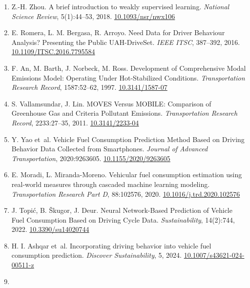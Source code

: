 \begin{enumerate}
{  \href{https://doi.org/10.1109/ACCESS.2026.3664118}{10.1109/ACCESS.2026.3664118}}
\item
  \label{r25}{Z.-H. Zhou. A brief introduction to weakly
  supervised learning. \emph{National Science Review}, 5(1):44--53,
  2018. \href{https://doi.org/10.1093/nsr/nwx106}{10.1093/nsr/nwx106}}
\item
  \label{r26}{E. Romera, L. M. Bergasa, R. Arroyo. Need
  Data for Driver Behaviour Analysis? Presenting the Public
  UAH-DriveSet. \emph{IEEE ITSC}, 387--392, 2016.
  \href{https://doi.org/10.1109/ITSC.2016.7795584}{10.1109/ITSC.2016.7795584}}
\item
  \label{r27}{F. An, M. Barth, J. Norbeck, M. Ross.
  Development of Comprehensive Modal Emissions Model: Operating Under
  Hot-Stabilized Conditions. \emph{Transportation Research Record},
  1587:52--62, 1997.
  \href{https://doi.org/10.3141/1587-07}{10.3141/1587-07}}
\item
  \label{r28}{S. Vallamsundar, J. Lin. MOVES Versus
  MOBILE: Comparison of Greenhouse Gas and Criteria Pollutant Emissions.
  \emph{Transportation Research Record}, 2233:27--35, 2011.
  \href{https://doi.org/10.3141/2233-04}{10.3141/2233-04}}
\item
  \label{r29}{Y. Yao et~al. Vehicle Fuel Consumption
  Prediction Method Based on Driving Behavior Data Collected from
  Smartphones. \emph{Journal of Advanced Transportation}, 2020:9263605.
  \href{https://doi.org/10.1155/2020/9263605}{10.1155/2020/9263605}}
\item
  \label{r30}{E. Moradi, L. Miranda-Moreno. Vehicular
  fuel consumption estimation using real-world measures through cascaded
  machine learning modeling. \emph{Transportation Research Part D},
  88:102576, 2020.
  \href{https://doi.org/10.1016/j.trd.2020.102576}{10.1016/j.trd.2020.102576}}
\item
  \label{r31}{J. Topić, B. Škugor, J. Deur. Neural
  Network-Based Prediction of Vehicle Fuel Consumption Based on Driving
  Cycle Data. \emph{Sustainability}, 14(2):744, 2022.
  \href{https://doi.org/10.3390/su14020744}{10.3390/su14020744}}
\item
  \label{r32}{H. I. Ashqar et~al. Incorporating driving
  behavior into vehicle fuel consumption prediction. \emph{Discover
  Sustainability}, 5, 2024.
  \href{https://doi.org/10.1007/s43621-024-00511-z}{10.1007/s43621-024-00511-z}}
\item

\end{enumerate}
